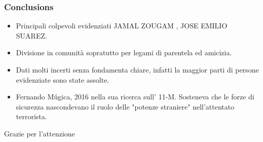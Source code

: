\documentclass[hyperref={pdfpagelabels=false}]{beamer}
\begin{document}
\begin{frame}
\frametitle{Conclusions}
\begin{itemize}
    \item Principali colpevoli evidenziati JAMAL ZOUGAM , JOSE EMILIO SUAREZ.
    \item Divisione in comunità sopratutto per legami di parentela ed amicizia.
    \item Dati molti incerti senza fondamenta chiare, infatti la maggior parti di persone evidenziate sono state assolte. 
    \item Fernando Múgica, 2016 nella sua ricerca sull' 11-M. Sosteneva che le forze di sicurezza nascondevano il ruolo delle "potenze straniere" nell'attentato terrorista. 
\end{itemize}

\end{frame}

\begin{frame}
\Huge{\centerline{Grazie per l'attenzione}}
\end{frame}
\end{document}
